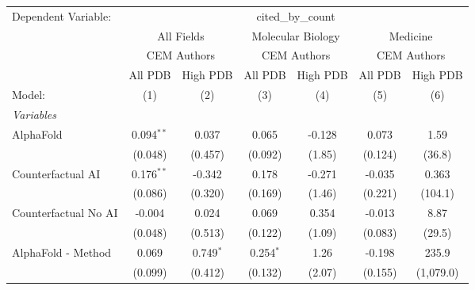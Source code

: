 \begingroup
\centering
\begin{tabular}{lcccccc}
   \tabularnewline \midrule \midrule
   Dependent Variable: & \multicolumn{6}{c}{cited\_by\_count}\\
 & \multicolumn{2}{c}{All Fields} & \multicolumn{2}{c}{Molecular Biology} & \multicolumn{2}{c}{Medicine} \\
\cmidrule(lr){2-3} \cmidrule(lr){4-5} \cmidrule(lr){6-7}
 & \multicolumn{2}{c}{CEM Authors} & \multicolumn{2}{c}{CEM Authors} & \multicolumn{2}{c}{CEM Authors} \\
\cmidrule(lr){2-3} \cmidrule(lr){4-5} \cmidrule(lr){6-7}
 & \multicolumn{1}{c}{All PDB} & \multicolumn{1}{c}{High PDB} & \multicolumn{1}{c}{All PDB} & \multicolumn{1}{c}{High PDB} & \multicolumn{1}{c}{All PDB} & \multicolumn{1}{c}{High PDB} \\
\cmidrule(lr){2-2} \cmidrule(lr){3-3} \cmidrule(lr){4-4} \cmidrule(lr){5-5} \cmidrule(lr){6-6} \cmidrule(lr){7-7}
   Model:                                                     & (1)          & (2)          & (3)           & (4)    & (5)     & (6)\\  
   \midrule
   \emph{Variables}\\
   AlphaFold                                                  & 0.094$^{**}$ & 0.037        & 0.065         & -0.128 & 0.073   & 1.59\\   
                                                              & (0.048)      & (0.457)      & (0.092)       & (1.85) & (0.124) & (36.8)\\   
   Counterfactual AI                                          & 0.176$^{**}$ & -0.342       & 0.178         & -0.271 & -0.035  & 0.363\\   
                                                              & (0.086)      & (0.320)      & (0.169)       & (1.46) & (0.221) & (104.1)\\   
   Counterfactual No AI                                       & -0.004       & 0.024        & 0.069         & 0.354  & -0.013  & 8.87\\   
                                                              & (0.048)      & (0.513)      & (0.122)       & (1.09) & (0.083) & (29.5)\\   
   AlphaFold - Method                                         & 0.069        & 0.749$^{*}$  & 0.254$^{*}$   & 1.26   & -0.198  & 235.9\\   
                                                              & (0.099)      & (0.412)      & (0.132)       & (2.07) & (0.155) & (1,079.0)\\   

\end{tabular}
